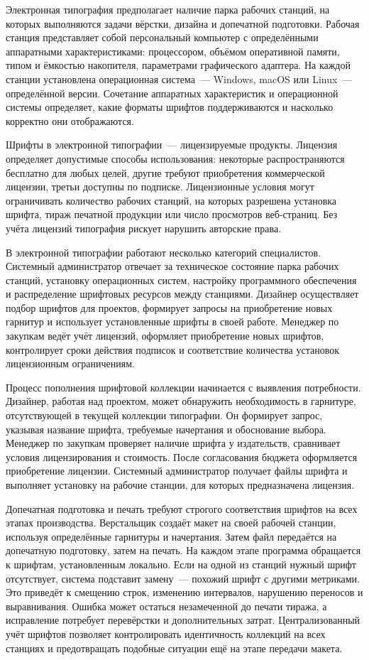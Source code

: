 Электронная типография предполагает наличие парка рабочих станций, на которых выполняются задачи вёрстки, дизайна и допечатной подготовки. Рабочая станция представляет собой персональный компьютер с определёнными аппаратными характеристиками: процессором, объёмом оперативной памяти, типом и ёмкостью накопителя, параметрами графического адаптера. На каждой станции установлена операционная система~--- Windows, macOS или Linux~--- определённой версии. Сочетание аппаратных характеристик и операционной системы определяет, какие форматы шрифтов поддерживаются и насколько корректно они отображаются.

Шрифты в электронной типографии~--- лицензируемые продукты. Лицензия определяет допустимые способы использования: некоторые  распространяются бесплатно для любых целей, другие требуют приобретения коммерческой лицензии, третьи доступны по подписке. Лицензионные условия могут ограничивать количество рабочих станций, на которых разрешена установка шрифта, тираж печатной продукции или число просмотров веб-страниц. Без учёта лицензий типография рискует нарушить авторские права.

В электронной типографии работают несколько категорий специалистов. Системный администратор отвечает за техническое состояние парка рабочих станций, установку операционных систем, настройку программного обеспечения и распределение шрифтовых ресурсов между станциями. Дизайнер осуществляет подбор шрифтов для проектов, формирует запросы на приобретение новых гарнитур и использует установленные шрифты в своей работе. Менеджер по закупкам ведёт учёт лицензий, оформляет приобретение новых шрифтов, контролирует сроки действия подписок и соответствие количества установок лицензионным ограничениям.

Процесс пополнения шрифтовой коллекции начинается с выявления потребности. Дизайнер, работая над проектом, может обнаружить необходимость в гарнитуре, отсутствующей в текущей коллекции типографии. Он формирует запрос, указывая название шрифта, требуемые начертания и обоснование выбора. Менеджер по закупкам проверяет наличие шрифта у издательств, сравнивает условия лицензирования и стоимость. После согласования бюджета оформляется приобретение лицензии. Системный администратор получает файлы шрифта и выполняет установку на рабочие станции, для которых предназначена лицензия.

Допечатная подготовка и печать требуют строгого соответствия шрифтов на всех этапах производства. Верстальщик создаёт макет на своей рабочей станции, используя определённые гарнитуры и начертания. Затем файл передаётся на допечатную подготовку, затем на печать. На каждом этапе программа обращается к шрифтам, установленным локально. Если на одной из станций нужный шрифт отсутствует, система подставит замену~--- похожий шрифт с другими метриками. Это приведёт к смещению строк, изменению интервалов, нарушению переносов и выравнивания. Ошибка может остаться незамеченной до печати тиража, а исправление потребует перевёрстки и дополнительных затрат. Централизованный учёт шрифтов позволяет контролировать идентичность коллекций на всех станциях и предотвращать подобные ситуации ещё на этапе передачи макета.

